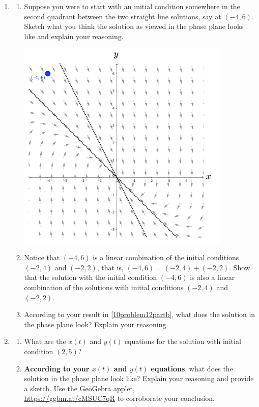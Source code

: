 \begin{enumerate}
\item \label{10problem12}
\begin{enumerate}
\item Suppose you were to start with an initial condition somewhere in the second quadrant between the two straight line solutions, say at $(-4, 6)$. Sketch what you think the solution as viewed in the phase plane looks like and explain your reasoning. \label{10problem12parta}
\begin{center}
\includegraphics[width=4in]{10/10VectorField2.png}
\end{center}
\item Notice that $(-4,6)$ is a linear combination of the initial conditions $(-2,4)$ and $(-2,2)$, that is, $(-4,6)=(-2,4)+(-2,2)$. Show that the solution with the initial condition $(-4, 6)$ is also a linear combination of the solutions with initial conditions $(-2,4)$ and $(-2,2)$. \label{10problem12partb}
\vfill
\item  According to your result in \ref{10problem12partb}, what does the solution in the phase plane look? Explain your reasoning. \label{10problem12partc}
\vfill
\end{enumerate}
\clearpage

\item \label{10problem13} \begin{enumerate}
\item What are the $x(t)$ and $y(t)$ equations for the solution with initial condition $(2,5)$? \label{10problem13parta}
\vfill
\item \textbf{According to your $x(t)$ and $y(t)$ equations}, what does the solution in the phase plane look like? Explain your reasoning and provide a sketch. Use the GeoGebra applet,\\ \href{https://ggbm.at/cMSUC7qR}{\underline{https://ggbm.at/cMSUC7qR}} to corroborate your conclusion. \label{10problem13partb}


\end{enumerate}
\end{enumerate}
